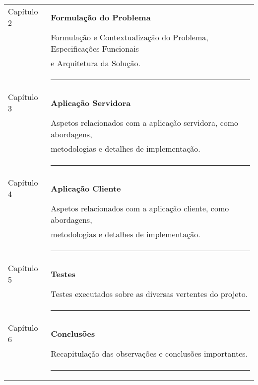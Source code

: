 \begin{tabular}{ll}
	Capítulo 2 & {\bf Formulação do Problema} \\
	& Formulação e Contextualização do Problema, Especificações Funcionais \\
	& e Arquitetura da Solução.\\
	&\rule{75mm}{0.5pt}\\
	Capítulo 3 & {\bf Aplicação Servidora} \\
	& Aspetos relacionados com a aplicação servidora, como abordagens, \\
	& metodologias e detalhes de implementação.\\
	&\rule{75mm}{0.5pt}\\
	Capítulo 4 & {\bf Aplicação Cliente} \\
	& Aspetos relacionados com a aplicação cliente, como abordagens, \\
	&metodologias e detalhes de implementação.\\
	&\rule{75mm}{0.5pt}\\
	Capítulo 5 & {\bf Testes} \\
	& Testes executados sobre as diversas vertentes do projeto.\\
	&\rule{75mm}{0.5pt}\\
	Capítulo 6 & {\bf Conclusões} \\
	& Recapitulação das observações e conclusões importantes.\\
	&\rule{75mm}{0.5pt}\\
\end{tabular}
